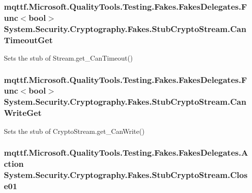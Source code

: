 \hypertarget{class_system_1_1_security_1_1_cryptography_1_1_fakes_1_1_stub_crypto_stream_a80da51fd11444c8a7fd87decac147b90}{
\subsubsection[{Can\-Timeout\-Get}]{\setlength{\rightskip}{0pt plus 5cm}mqttf.\-Microsoft.\-Quality\-Tools.\-Testing.\-Fakes.\-Fakes\-Delegates.\-Func$<$bool$>$ System.\-Security.\-Cryptography.\-Fakes.\-Stub\-Crypto\-Stream.\-Can\-Timeout\-Get}}\label{class_system_1_1_security_1_1_cryptography_1_1_fakes_1_1_stub_crypto_stream_a80da51fd11444c8a7fd87decac147b90}


Sets the stub of Stream.\-get\-\_\-\-Can\-Timeout()

\hypertarget{class_system_1_1_security_1_1_cryptography_1_1_fakes_1_1_stub_crypto_stream_a892b09c2e40ba59d840adedcfab68ce3}{
\subsubsection[{Can\-Write\-Get}]{\setlength{\rightskip}{0pt plus 5cm}mqttf.\-Microsoft.\-Quality\-Tools.\-Testing.\-Fakes.\-Fakes\-Delegates.\-Func$<$bool$>$ System.\-Security.\-Cryptography.\-Fakes.\-Stub\-Crypto\-Stream.\-Can\-Write\-Get}}\label{class_system_1_1_security_1_1_cryptography_1_1_fakes_1_1_stub_crypto_stream_a892b09c2e40ba59d840adedcfab68ce3}


Sets the stub of Crypto\-Stream.\-get\-\_\-\-Can\-Write()

\hypertarget{class_system_1_1_security_1_1_cryptography_1_1_fakes_1_1_stub_crypto_stream_a961f813df7f55aefa2b4f6eddb85bcbb}{
\subsubsection[{Close01}]{\setlength{\rightskip}{0pt plus 5cm}mqttf.\-Microsoft.\-Quality\-Tools.\-Testing.\-Fakes.\-Fakes\-Delegates.\-Action System.\-Security.\-Cryptography.\-Fakes.\-Stub\-Crypto\-Stream.\-Close01}}\label{class_system_1_1_security_1_1_cryptography_1_1_fakes_1_1_stub_crypto_stream_a961f813df7f55aefa2b4f6eddb85bcbb}



